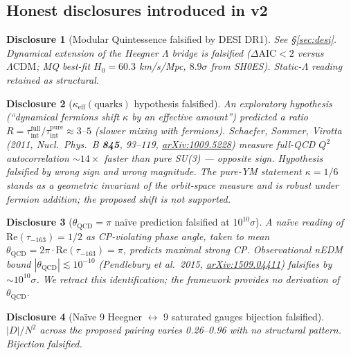 \documentclass[11pt,a4paper]{article}
\newtheorem{disclosure}{Disclosure}
\newcommand{\LCDM}{\Lambda\mathrm{CDM}}
\newcommand{\AIC}{\mathrm{AIC}}
\begin{document}
\subsection{Honest disclosures introduced in v2}

\begin{disclosure}[Modular Quintessence falsified by DESI DR1]
See \S\ref{sec:desi}. Dynamical extension of the Heegner $\Lambda$ bridge is falsified ($\Delta\AIC < 2$ versus $\LCDM$; MQ best-fit $H_0 = 60.3$ km/s/Mpc, $8.9\sigma$ from SH0ES). Static-$\Lambda$ reading retained as structural.
\end{disclosure}

\begin{disclosure}[$\kappa_\mathrm{eff}(\text{quarks})$ hypothesis falsified]
An exploratory hypothesis (``dynamical fermions shift $\kappa$ by an effective amount'') predicted a ratio $R = \tau_\mathrm{int}^\mathrm{full}/\tau_\mathrm{int}^\mathrm{pure} \approx 3$--$5$ (slower mixing with fermions). Schaefer, Sommer, Virotta (2011, \emph{Nucl.\ Phys.\ B} \textbf{845}, 93--119, \href{https://arxiv.org/abs/1009.5228}{arXiv:1009.5228}) measure full-QCD $Q^2$ autocorrelation $\sim 14\times$ \emph{faster} than pure SU(3) --- opposite sign. Hypothesis falsified by wrong sign and wrong magnitude. The pure-YM statement $\kappa = 1/6$ stands as a geometric invariant of the orbit-space measure and is robust under fermion addition; the proposed shift is not supported.
\end{disclosure}

\begin{disclosure}[$\theta_\mathrm{QCD} = \pi$ naïve prediction falsified at $10^{10}\sigma$]
A naïve reading of $\mathrm{Re}(\tau_{-163}) = 1/2$ as CP-violating phase angle, taken to mean $\theta_\mathrm{QCD} = 2\pi \cdot \mathrm{Re}(\tau_{-163}) = \pi$, predicts maximal strong CP. Observational nEDM bound $|\theta_\mathrm{QCD}| \lesssim 10^{-10}$ (Pendlebury et al.\ 2015, \href{https://arxiv.org/abs/1509.04411}{arXiv:1509.04411}) falsifies by $\sim 10^{10}\sigma$. We retract this identification; the framework provides no derivation of $\theta_\mathrm{QCD}$.
\end{disclosure}

\begin{disclosure}[Naïve 9 Heegner $\leftrightarrow$ 9 saturated gauges bijection falsified]
$|D|/N^2$ across the proposed pairing varies 0.26--0.96 with no structural pattern. Bijection falsified.
\end{disclosure}
\end{document}

